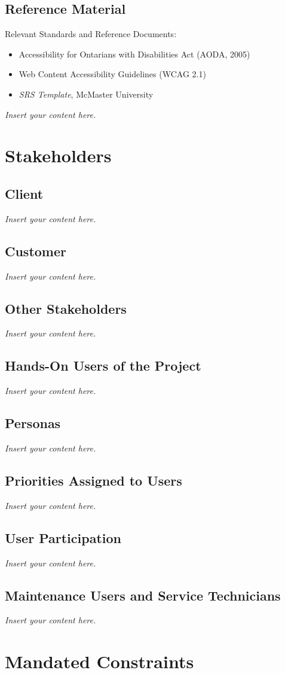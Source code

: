\documentclass[12pt]{article}
\newcommand{\lips}{\textit{Insert your content here.}}
\begin{document}
\subsection{Reference Material}
Relevant Standards and Reference Documents:
\begin{itemize}
    \item Accessibility for Ontarians with Disabilities Act (AODA, 2005)
    \item Web Content Accessibility Guidelines (WCAG 2.1)
    \item \textit{SRS Template}, McMaster University
\end{itemize}


\lips
\section{Stakeholders}
\subsection{Client}
\lips
\subsection{Customer}
\lips
\subsection{Other Stakeholders}
\lips
\subsection{Hands-On Users of the Project}
\lips
\subsection{Personas}
\lips
\subsection{Priorities Assigned to Users}
\lips
\subsection{User Participation}
\lips
\subsection{Maintenance Users and Service Technicians}
\lips

\section{Mandated Constraints}
\end{document}
